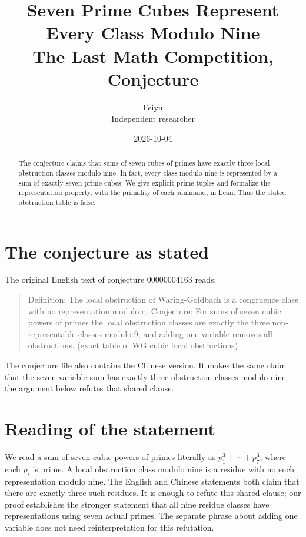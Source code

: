 \documentclass[11pt]{article}
\title{Seven Prime Cubes Represent Every Class Modulo Nine\\[0.4em]\large The Last Math Competition, Conjecture \conjid}
\author{Feiyu\\ \small Independent researcher}
\date{2026-10-04}
\theoremstyle{plain}
\theoremstyle{definition}
\theoremstyle{remark}
\newcommand{\conjid}{00000004163}
\begin{document}
\maketitle

\begin{abstract}
The conjecture claims that sums of seven cubes of primes have exactly three local obstruction classes modulo nine. In fact, every class modulo nine is represented by a sum of exactly seven prime cubes. We give explicit prime tuples and formalize the representation property, with the primality of each summand, in Lean. Thus the stated obstruction table is false.
\end{abstract}

\section{The conjecture as stated}

The original English text of conjecture \conjid{} reads:

\begin{quote}
Definition: The local obstruction of Waring-Goldbach is a congruence class with no representation modulo q. Conjecture: For sums of seven cubic powers of primes the local obstruction classes are exactly the three non-representable classes modulo 9, and adding one variable removes all obstructions. (exact table of WG cubic local obstructions)
\end{quote}

The conjecture file also contains the Chinese version. It makes the same claim that the seven-variable sum has exactly three obstruction classes modulo nine; the argument below refutes that shared clause.

\section{Reading of the statement}


We read a sum of seven cubic powers of primes literally as $p_1^3+\cdots+p_7^3$, where each $p_i$ is prime. A local obstruction class modulo nine is a residue with no such representation modulo nine. The English and Chinese statements both claim that there are exactly three such residues. It is enough to refute this shared clause; our proof establishes the stronger statement that all nine residue classes have representations using seven actual primes. The separate phrase about adding one variable does not need reinterpretation for this refutation.
\end{document}
